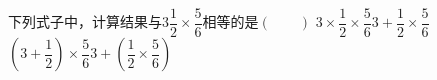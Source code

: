 下列式子中，计算结果与$3\dfrac{1}{2}×\dfrac{5}{6}$相等的是\hfill$\left(\qquad\right)$\fourchoices
{$3×\dfrac{1}{2}×\dfrac{5}{6}$}{$3+\dfrac{1}{2}×\dfrac{5}{6}$}
{$\left(3+\dfrac{1}{2}\right)×\dfrac{5}{6}$}{$3+\left(\dfrac{1}{2}×\dfrac{5}{6}\right)$}